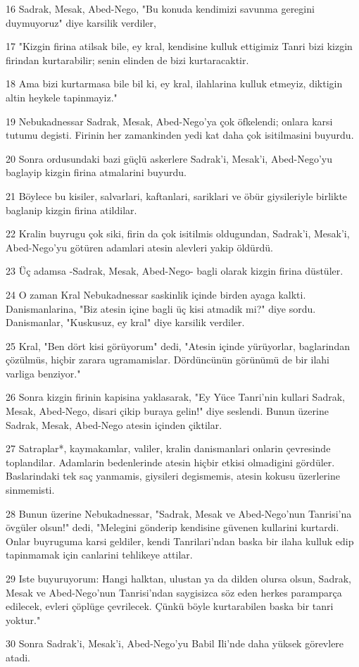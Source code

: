 \par 16 Sadrak, Mesak, Abed-Nego, "Bu konuda kendimizi savunma geregini duymuyoruz" diye karsilik verdiler,
\par 17 "Kizgin firina atilsak bile, ey kral, kendisine kulluk ettigimiz Tanri bizi kizgin firindan kurtarabilir; senin elinden de bizi kurtaracaktir.
\par 18 Ama bizi kurtarmasa bile bil ki, ey kral, ilahlarina kulluk etmeyiz, diktigin altin heykele tapinmayiz."
\par 19 Nebukadnessar Sadrak, Mesak, Abed-Nego'ya çok öfkelendi; onlara karsi tutumu degisti. Firinin her zamankinden yedi kat daha çok isitilmasini buyurdu.
\par 20 Sonra ordusundaki bazi güçlü askerlere Sadrak'i, Mesak'i, Abed-Nego'yu baglayip kizgin firina atmalarini buyurdu.
\par 21 Böylece bu kisiler, salvarlari, kaftanlari, sariklari ve öbür giysileriyle birlikte baglanip kizgin firina atildilar.
\par 22 Kralin buyrugu çok siki, firin da çok isitilmis oldugundan, Sadrak'i, Mesak'i, Abed-Nego'yu götüren adamlari atesin alevleri yakip öldürdü.
\par 23 Üç adamsa -Sadrak, Mesak, Abed-Nego- bagli olarak kizgin firina düstüler.
\par 24 O zaman Kral Nebukadnessar saskinlik içinde birden ayaga kalkti. Danismanlarina, "Biz atesin içine bagli üç kisi atmadik mi?" diye sordu. Danismanlar, "Kuskusuz, ey kral" diye karsilik verdiler.
\par 25 Kral, "Ben dört kisi görüyorum" dedi, "Atesin içinde yürüyorlar, baglarindan çözülmüs, hiçbir zarara ugramamislar. Dördüncünün görünümü de bir ilahi varliga benziyor."
\par 26 Sonra kizgin firinin kapisina yaklasarak, "Ey Yüce Tanri'nin kullari Sadrak, Mesak, Abed-Nego, disari çikip buraya gelin!" diye seslendi. Bunun üzerine Sadrak, Mesak, Abed-Nego atesin içinden çiktilar.
\par 27 Satraplar*, kaymakamlar, valiler, kralin danismanlari onlarin çevresinde toplandilar. Adamlarin bedenlerinde atesin hiçbir etkisi olmadigini gördüler. Baslarindaki tek saç yanmamis, giysileri degismemis, atesin kokusu üzerlerine sinmemisti.
\par 28 Bunun üzerine Nebukadnessar, "Sadrak, Mesak ve Abed-Nego'nun Tanrisi'na övgüler olsun!" dedi, "Melegini gönderip kendisine güvenen kullarini kurtardi. Onlar buyruguma karsi geldiler, kendi Tanrilari'ndan baska bir ilaha kulluk edip tapinmamak için canlarini tehlikeye attilar.
\par 29 Iste buyuruyorum: Hangi halktan, ulustan ya da dilden olursa olsun, Sadrak, Mesak ve Abed-Nego'nun Tanrisi'ndan saygisizca söz eden herkes paramparça edilecek, evleri çöplüge çevrilecek. Çünkü böyle kurtarabilen baska bir tanri yoktur."
\par 30 Sonra Sadrak'i, Mesak'i, Abed-Nego'yu Babil Ili'nde daha yüksek görevlere atadi.

